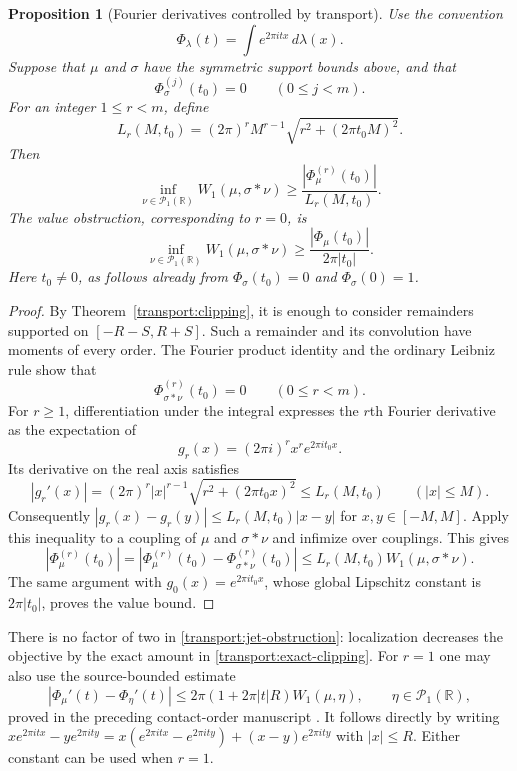 \documentclass[11pt,letterpaper]{article}
\newtheorem{proposition}[theorem]{Proposition}
\theoremstyle{definition}
\theoremstyle{remark}
\newcommand{\R}{\mathbb R}
\newcommand{\Pone}{\mathcal P_1(\R)}
\begin{document}
\begin{proposition}[Fourier derivatives controlled by transport]
\label{transport:jets}
Use the convention
\[
 \Phi_\lambda(t)=\int e^{2\pi itx}\,d\lambda(x).
\]
Suppose that $\mu$ and $\sigma$ have the symmetric support bounds above,
and that
\begin{equation}\label{transport:vanishing-jet}
 \Phi_\sigma^{(j)}(t_0)=0\qquad(0\le j<m).
\end{equation}
For an integer $1\le r<m$, define
\begin{equation}\label{transport:jet-constant}
 L_r(M,t_0)
 =(2\pi)^r M^{r-1}
     \sqrt{r^2+(2\pi t_0M)^2}.
\end{equation}
Then
\begin{equation}\label{transport:jet-obstruction}
 \inf_{\nu\in\Pone}W_1(\mu,\sigma*\nu)
 \ge \frac{|\Phi_\mu^{(r)}(t_0)|}{L_r(M,t_0)}.
\end{equation}
The value obstruction, corresponding to $r=0$, is
\begin{equation}\label{transport:value-obstruction}
 \inf_{\nu\in\Pone}W_1(\mu,\sigma*\nu)
 \ge\frac{|\Phi_\mu(t_0)|}{2\pi|t_0|}.
\end{equation}
Here $t_0\ne0$, as follows already from
$\Phi_\sigma(t_0)=0$ and $\Phi_\sigma(0)=1$.
\end{proposition}

\begin{proof}
By Theorem~\ref{transport:clipping}, it is enough to consider remainders
supported on $[-R-S,R+S]$.  Such a remainder and its convolution have
moments of every order.  The Fourier product identity and the ordinary
Leibniz rule show that
\[
 \Phi_{\sigma*\nu}^{(r)}(t_0)=0\qquad(0\le r<m).
\]
For $r\ge1$, differentiation under the integral expresses the $r$th
Fourier derivative as the expectation of
\[
 g_r(x)=(2\pi i)^r x^r e^{2\pi it_0x}.
\]
Its derivative on the real axis satisfies
\[
 |g_r'(x)|
 =(2\pi)^r|x|^{r-1}
      \sqrt{r^2+(2\pi t_0x)^2}
 \le L_r(M,t_0)\qquad(|x|\le M).
\]
Consequently $|g_r(x)-g_r(y)|\le L_r(M,t_0)|x-y|$ for
$x,y\in[-M,M]$.  Apply this inequality to a coupling of $\mu$ and
$\sigma*\nu$ and infimize over couplings.  This gives
\[
 |\Phi_\mu^{(r)}(t_0)|
 =|\Phi_\mu^{(r)}(t_0)-\Phi_{\sigma*\nu}^{(r)}(t_0)|
 \le L_r(M,t_0)W_1(\mu,\sigma*\nu).
\]
The same argument with $g_0(x)=e^{2\pi it_0x}$, whose global
Lipschitz constant is $2\pi|t_0|$, proves the value bound.
\end{proof}

There is no factor of two in \eqref{transport:jet-obstruction}:
localization decreases the objective by the exact amount in
\eqref{transport:exact-clipping}.  For $r=1$ one may also use the
source-bounded estimate
\begin{equation}\label{transport:first-derivative}
 |\Phi_\mu'(t)-\Phi_\eta'(t)|
 \le 2\pi(1+2\pi|t|R)W_1(\mu,\eta),
 \qquad \eta\in\Pone,
\end{equation}
proved in the preceding contact-order manuscript \cite{repo-contact}.
It follows directly by writing
$xe^{2\pi itx}-ye^{2\pi ity}
=x(e^{2\pi itx}-e^{2\pi ity})+(x-y)e^{2\pi ity}$
with $|x|\le R$.  Either constant can be used when $r=1$.
\end{document}
